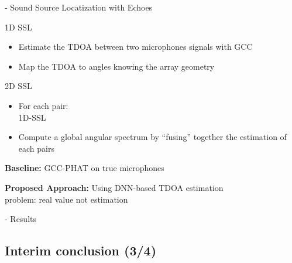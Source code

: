 \begin{frame}{\mirage - Sound Source Locatization with Echoes}

    \begin{block}{1D SSL}
        \begin{itemize}
            \item Estimate the TDOA between two microphones signals with GCC
            \item Map the TDOA to angles knowing the array geometry
        \end{itemize}
    \end{block}

    \begin{block}{2D SSL}
        \begin{itemize}
            \item For each pair:
            \\\hspace{1em} 1D-SSL
            \item Compute a global angular spectrum by ``fusing'' together the estimation of each pairs
        \end{itemize}
    \end{block}

    \begin{block}{\textbf{Baseline:}}
        GCC-PHAT on true microphones
    \end{block}

    \begin{block}{\textbf{Proposed Approach:}}
        Using DNN-based TDOA estimation
        \\problem: real value not estimation
    \end{block}
\end{frame}

\begin{frame}{\mirage - Results}

\end{frame}






\subsection{Interim conclusion (3/4)}

